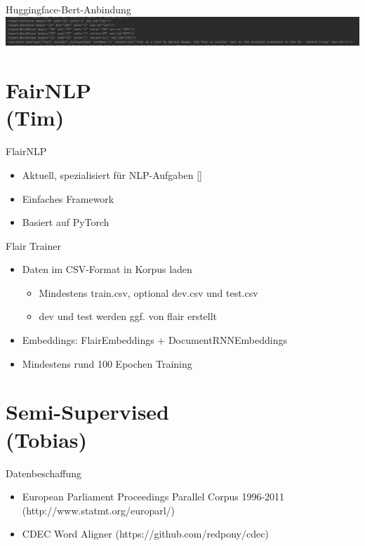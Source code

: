 \documentclass[xcolor=table]{beamer}
\begin{document}
\begin{frame}[t]{Huggingface-Bert-Anbindung}\vspace{10pt}
	\hspace*{-1cm}
	\includegraphics[scale=.25]{einbindung.png}	
\end{frame}


\section{FairNLP\\(Tim)}
\begin{frame}[t]{FlairNLP}\vspace{10pt}
\begin{itemize}
\item Aktuell, spezialisiert für NLP-Aufgaben [\cite{flair}]
\item Einfaches Framework
\item Basiert auf PyTorch
\end{itemize}
\end{frame}

\begin{frame}[t]{Flair Trainer}\vspace{10pt}
\begin{itemize}
\item Daten im CSV-Format in Korpus laden
\begin{itemize}
\item Mindestens train.csv, optional dev.csv und test.csv
\item dev und test werden ggf. von flair erstellt
\end{itemize}
\item Embeddings: FlairEmbeddings + DocumentRNNEmbeddings
\item Mindestens rund 100 Epochen Training
\end{itemize}
\end{frame}

\section{Semi-Supervised\\(Tobias)}
\begin{frame}[t]{Datenbeschaffung}\vspace{10pt}
\begin{itemize}
\item European Parliament Proceedings Parallel Corpus 1996-2011 (http://www.statmt.org/europarl/)
\item CDEC Word Aligner (https://github.com/redpony/cdec)
\end{itemize}
\end{frame}
\end{document}
